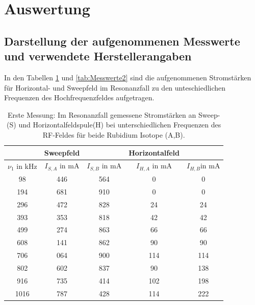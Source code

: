 \section{Auswertung}
\label{sec:Auswertung}
\subsection{Darstellung der aufgenommenen Messwerte und verwendete Herstellerangaben}
\label{subsec:erdbfeld}
In den Tabellen \ref{tab:Messwerte1} und \ref{tab:Messwerte2} sind die aufgenommenen Stromstärken für Horizontal- und Sweepfeld im Resonanzfall zu den unteschiedlichen Frequenzen des Hochfrequenzfeldes aufgetragen.
\begin{table}[H]
  \centering
  \caption{Erste Messung: Im Resonanzfall gemessene Stromstärken an Sweep-(S) und Horizontalfeldspule(H) bei unterschiedlichen Frequenzen des RF-Feldes für beide Rubidium Isotope (A,B).}
  \label{tab:Messwerte1}
  \begin{tabular}{c|cc|cc}
  & Sweepfeld & & Horizontalfeld &\\
  \hline
  $\nu_1$ in kHz& $I_{S,A}$ in $\si{\milli\ampere}$& $I_{S,B}$ in \si{\milli\ampere}&$I_{H,A}$ in \si{\milli\ampere}& $I_{H,B}$in \si{\milli\ampere}\\
  \hline
  98  &446 &564 &0   &0   \\
  194 &681 &910 &0   &0   \\
  296 &472 &828 &24  &24  \\
  393 &353 &818 &42  &42  \\
  499 &274 &863 &66  &66  \\
  608 &141 &862 &90  &90  \\
  706 &064 &900 &114 &114 \\
  802 &602 &837 &90  &138 \\
  916 &735 &414 &102 &198 \\
  1016&787 &428 &114 &222 \\
  \hline
  \end{tabular}
\end{table}
